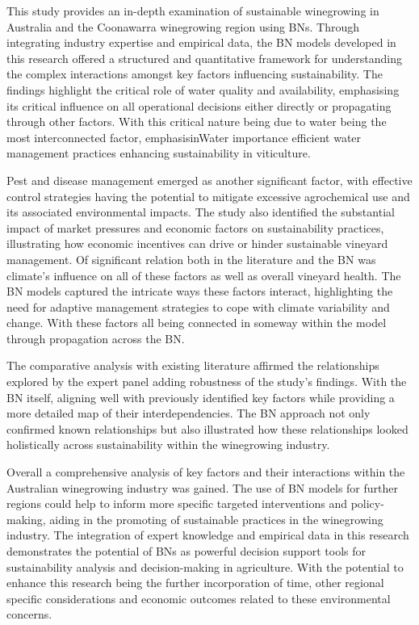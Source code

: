 \documentclass[10pt,letterpaper]{article}
\begin{document}
This study provides an in-depth examination of sustainable winegrowing in Australia and the Coonawarra winegrowing region using BNs. Through integrating industry expertise and empirical data, the BN models developed in this research offered a structured and quantitative framework for understanding the complex interactions amongst key factors influencing sustainability. The findings highlight the critical role of water quality and availability, emphasising its critical influence on all operational decisions either directly or propagating through other factors. With this critical nature being due to water being the most interconnected factor, emphasisinWater importance efficient water management practices enhancing sustainability in viticulture.

Pest and disease management emerged as another significant factor, with effective control strategies having the potential to mitigate excessive agrochemical use and its associated environmental impacts. The study also identified the substantial impact of market pressures and economic factors on sustainability practices, illustrating how economic incentives can drive or hinder sustainable vineyard management. Of significant relation both in the literature and the BN was climate's influence on all of these factors as well as overall vineyard health. The BN models captured the intricate ways these factors interact, highlighting the need for adaptive management strategies to cope with climate variability and change. With these factors all being connected in someway within the model through propagation across the BN.\@

The comparative analysis with existing literature affirmed the relationships explored by the expert panel adding robustness of the study's findings. With the BN itself, aligning well with previously identified key factors while providing a more detailed map of their interdependencies. The BN approach not only confirmed known relationships but also illustrated how these relationships looked holistically across sustainability within the winegrowing industry.

Overall a comprehensive analysis of key factors and their interactions within the Australian winegrowing industry was gained. The use of BN models for further regions could help to inform more specific targeted interventions and policy-making, aiding in the promoting of sustainable practices in the winegrowing industry. The integration of expert knowledge and empirical data in this research demonstrates the potential of BNs as powerful decision support tools for sustainability analysis and decision-making in agriculture. With the potential to enhance this research being the further incorporation of time, other regional specific considerations and economic outcomes related to these environmental concerns.
\end{document}

